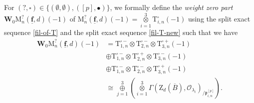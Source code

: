 \documentclass[10pt]{amsart}
\numberwithin{equation}{section}
\theoremstyle{plain}
\numberwithin{equation}{section}
\theoremstyle{definition}
\theoremstyle{remark}
\def\triplef{\underline{\mathbf{f}}}
\def\threetensor{\overset{3}{\underset{i=1}\otimes}}
\def\threesum{\overset{3}{\underset{j=1}\oplus} }
\def\calO{\mathcal{O}}
\def\frakp{\mathfrak{p}}
\def\rmM{\mathrm{M}}
\def\rmT{\mathrm{T}}
\def\rmZ{\mathrm{Z}}
\def\bfW{\mathbf{W}}
\begin{document}
For $(?,\square)\in\{(\emptyset, \emptyset), ([p], \bullet)\}$, we formally define the \emph{weight zero part} $\bfW_{0}\rmM^{?}_{n}(\triplef, d)(-1)$ of $\rmM^{?}_{n}(\triplef, d)(-1)=\threetensor\rmT^{\square}_{i,n}(-1)$ using the split exact sequence \ref{fil-of-T} and the split exact sequence \ref{fil-T-new} such that we have
\begin{equation*}
\begin{aligned}
\bfW_{0}\rmM^{?}_{n}(\triplef, d)(-1)&=\rmT^{\square-}_{1, n}\otimes\rmT^{\square-}_{2, n}\otimes\rmT^{\square+}_{3, n}(-1)\\
&\oplus\rmT^{\square-}_{1, n}\otimes\rmT^{\square+}_{2, n}\otimes\rmT^{\square-}_{3, n}(-1)\\
&\oplus\rmT^{\square-}_{1, n}\otimes\rmT^{\square-}_{2, n}\otimes\rmT^{\square+}_{3, n}(-1)\\
&\cong\threesum (\threetensor\Gamma(\rmZ_{d}(\overline{B}),\calO_{\lambda_{i}})_{/\frakp^{[p]}_{i,n}}).\\
\end{aligned}
\end{equation*}
\end{document}

